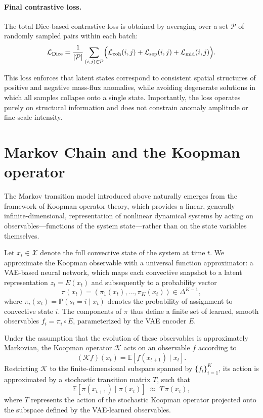 \documentclass[11pt]{article}
\begin{document}
\paragraph{Final contrastive loss.}
The total Dice-based contrastive loss is obtained by averaging over a set $\mathcal{P}$ of randomly sampled pairs within each batch:
\[
\mathcal{L}_{\mathrm{Dice}}
=
\frac{1}{|\mathcal{P}|}
\sum_{(i,j)\in\mathcal{P}}
\Bigl(
\mathcal{L}_{\mathrm{coh}}(i,j)
+
\mathcal{L}_{\mathrm{sep}}(i,j)
+
\mathcal{L}_{\mathrm{mid}}(i,j)
\Bigr).
\]

This loss enforces that latent states correspond to consistent spatial structures of positive and negative mass-flux anomalies, while avoiding degenerate solutions in which all samples collapse onto a single state. Importantly, the loss operates purely on structural information and does not constrain anomaly amplitude or fine-scale intensity.


\section{Markov Chain and the Koopman operator}

The Markov transition model introduced above naturally emerges from the framework of Koopman operator theory, which provides a linear, generally infinite-dimensional, representation of nonlinear dynamical systems by acting on observables---functions of the system state---rather than on the state variables themselves.

Let $x_t \in \mathcal{X}$ denote the full convective state of the system at time $t$. We approximate the Koopman observable with a universal function approximator: a VAE-based neural network, which maps each convective snapshot to a latent representation $z_t = E(x_t)$ and subsequently to a probability vector
\[
\pi(x_t) = (\pi_1(x_t), \ldots, \pi_K(x_t)) \in \Delta^{K-1},
\]
where $\pi_i(x_t) = \mathbb{P}(s_t = i \mid x_t)$ denotes the probability of assignment to convective state $i$. The components of $\pi$ thus define a finite set of learned, smooth observables $f_i = \pi_i \circ E$, parameterized by the VAE encoder $E$.

Under the assumption that the evolution of these observables is approximately Markovian, the Koopman operator $\mathcal{K}$ acts on an observable $f$ according to
\[
(\mathcal{K} f)(x_t) = \mathbb{E}\!\left[ f(x_{t+1}) \mid x_t \right].
\]
Restricting $\mathcal{K}$ to the finite-dimensional subspace spanned by $\{ f_i \}_{i=1}^K$, its action is approximated by a stochastic transition matrix $T$, such that
\[
\mathbb{E}\!\left[ \pi(x_{t+1}) \mid \pi(x_t) \right] \;\approx\; T \, \pi(x_t),
\]
where $T$ represents the action of the stochastic Koopman operator projected onto the subspace defined by the VAE-learned observables.
\end{document}
